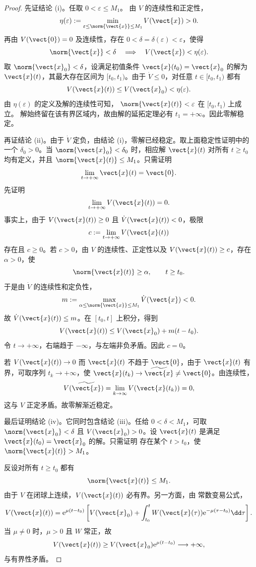 \begin{proof}
	先证结论 \textnormal{(i)}。任取 $0<\varepsilon\leq M_1$。
	由 $V$ 的连续性和正定性，
	\[
		\eta(\varepsilon)
		\mathrel{:=}
		\min_{\varepsilon\leq\norm{\vect{x}}\leq M_1}
		V(\vect{x})>0.
	\]
	再由 $V(\vect{0})=0$ 及连续性，存在
	$0<\delta=\delta(\varepsilon)<\varepsilon$，使得
	\[
		\norm{\vect{x}}<\delta
		\quad\Longrightarrow\quad
		V(\vect{x})<\eta(\varepsilon).
	\]
	取 $\norm{\vect{x}_0}<\delta$，设满足初值条件
	$\vect{x}(t_0)=\vect{x}_0$ 的解为 $\vect{x}(t)$，其最大存在区间为
	$[t_0,t_1)$。由于 $\dot V\leq0$，对任意
	$t\in[t_0,t_1)$ 都有
	\[
		V(\vect{x}(t))
		\leq V(\vect{x}_0)<\eta(\varepsilon).
	\]
	由 $\eta(\varepsilon)$ 的定义及解的连续性可知，
	$\norm{\vect{x}(t)}<\varepsilon$ 在 $[t_0,t_1)$ 上成立。
	解始终留在该有界区域内，故由解的延拓定理必有
	$t_1=+\infty$。因此零解稳定。

	再证结论 \textnormal{(ii)}。由于 $\dot V$ 定负，由结论
	\textnormal{(i)}，零解已经稳定。取上面稳定性证明中的一个
	$\delta_0>0$。当 $\norm{\vect{x}_0}<\delta_0$ 时，相应解
	$\vect{x}(t)$ 对所有 $t\geq t_0$ 均有定义，并且
	$\norm{\vect{x}(t)}\leq M_1$。只需证明
	\[
		\lim_{t\to+\infty}\vect{x}(t)=\vect{0}.
	\]
	先证明
	\[
		\lim_{t\to+\infty}V(\vect{x}(t))=0.
	\]
	事实上，由于 $V(\vect{x}(t))\geq0$ 且
	$\dot V(\vect{x}(t))<0$，极限
	\[
		c\mathrel{:=}
		\lim_{t\to+\infty}V(\vect{x}(t))
	\]
	存在且 $c\geq0$。若 $c>0$，由 $V$ 的连续性、正定性以及
	$V(\vect{x}(t))\geq c$，存在 $\alpha>0$，使
	\[
		\norm{\vect{x}(t)}\geq\alpha,
		\qquad t\geq t_0.
	\]
	于是由 $\dot V$ 的连续性和定负性，
	\[
		m\mathrel{:=}
		\max_{\alpha\leq\norm{\vect{x}}\leq M_1}
		\dot V(\vect{x})<0.
	\]
	故 $\dot V(\vect{x}(t))\leq m$。在 $[t_0,t]$ 上积分，得到
	\[
		V(\vect{x}(t))
		\leq V(\vect{x}_0)+m(t-t_0).
	\]
	令 $t\to+\infty$，右端趋于 $-\infty$，与左端非负矛盾。因此
	$c=0$。

	若 $V(\vect{x}(t))\to0$ 而 $\vect{x}(t)$ 不趋于
	$\vect{0}$，由于 $\vect{x}(t)$ 有界，可取序列
	$t_k\to+\infty$，使
	$\vect{x}(t_k)\to\widetilde{\vect{x}}\neq\vect{0}$。由连续性，
	\[
		V(\widetilde{\vect{x}})
		=\lim_{k\to\infty}V(\vect{x}(t_k))=0,
	\]
	这与 $V$ 正定矛盾。故零解渐近稳定。

	最后证明结论 \textnormal{(iv)}。它同时包含结论
	\textnormal{(iii)}。任给 $0<\delta<M_1$，可取
	$\norm{\vect{x}_0}<\delta$ 且 $V(\vect{x}_0)>0$。设
	$\vect{x}(t)$ 是满足 $\vect{x}(t_0)=\vect{x}_0$ 的解。只需证明
	存在某个 $t>t_0$，使 $\norm{\vect{x}(t)}>M_1$。

	反设对所有 $t\geq t_0$ 都有
	\[
		\norm{\vect{x}(t)}\leq M_1.
	\]
	由于 $V$ 在闭球上连续，$V(\vect{x}(t))$ 必有界。另一方面，由
	常数变易公式，
	\[
		V(\vect{x}(t))
		=\mathrm{e}^{\mu(t-t_0)}
		\left[
		V(\vect{x}_0)
		+\int_{t_0}^t
		W(\vect{x}(\tau))
		\mathrm{e}^{-\mu(\tau-t_0)}\dd\tau
		\right].
	\]
	当 $\mu\neq0$ 时，$\mu>0$ 且 $W$ 常正，故
	\[
		V(\vect{x}(t))
		\geq V(\vect{x}_0)\mathrm{e}^{\mu(t-t_0)}
		\longrightarrow+\infty,
	\]
	与有界性矛盾。


\end{proof}
